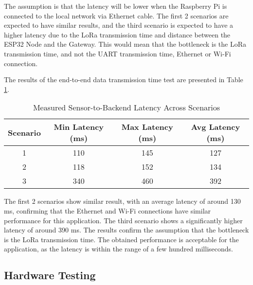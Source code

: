 The assumption is that the latency will be lower when the Raspberry Pi is connected to the local network via Ethernet cable.
The first 2 scenarios are expected to have similar results, and the third scenario is expected to have a higher latency due to the LoRa transmission
time and distance between the ESP32 Node and the Gateway. This would mean that the bottleneck is the LoRa transmission time, and not the UART transmission time,
Ethernet or Wi-Fi connection.

The results of the end-to-end data transmission time test are presented in Table \ref{tab:latency_results}.
\begin{table}[H]
\centering
\begin{tabular}{|c|c|c|c|}
\hline
\textbf{Scenario} & \textbf{Min Latency (ms)} & \textbf{Max Latency (ms)} & \textbf{Avg Latency (ms)} \\
\hline
1 & 110 & 145 & 127 \\
\hline
2 & 118 & 152 & 134 \\
\hline
3 & 340 & 460 & 392 \\
\hline
\end{tabular}
\caption{Measured Sensor-to-Backend Latency Across Scenarios}
\label{tab:latency_results}
\end{table}

The first 2 scenarios show similar result, with an average latency of around 130 ms, confirming that the Ethernet and Wi-Fi connections have similar
performance for this application. The third scenario shows a significantly higher latency of around 390 ms. The results confirm the assumption
that the bottleneck is the LoRa transmission time. The obtained performance is acceptable for the application, as the latency is within the range of 
a few hundred milliseconds. 

\subsection{Hardware Testing}
